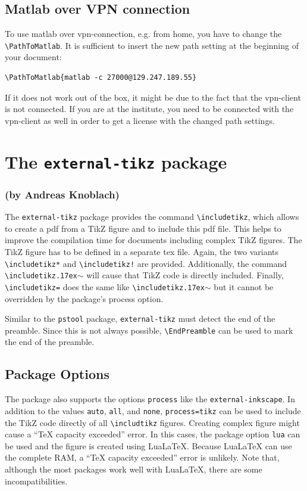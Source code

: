 \documentclass{article}
\let\otextbackslash\textbackslash
\renewcommand\textbackslash{{\rmfamily\otextbackslash}}
\def\tttilde{\raise.17ex\hbox{$\scriptstyle\mathtt{\sim}$}}
\begin{document}
\subsection{Matlab over VPN connection}
To use matlab over vpn-connection, e.g. from home, you have to change the \texttt{\textbackslash PathToMatlab}. It is sufficient to insert the new path setting at the beginning of your document:
\begin{verbatim}
\PathToMatlab{matlab -c 27000@129.247.189.55}
\end{verbatim}
If it does not work out of the box, it might be due to the fact that the vpn-client is not connected. If you are at the institute, you need to be connected with the vpn-client as well in order to get a license with the changed path settings.

\section{The \texttt{external-tikz} package}
\subsubsection*{(by Andreas Knoblach)}
The \texttt{external-tikz} package provides the command \texttt{\textbackslash includetikz}, which allows to create a pdf from a TikZ figure and to include this pdf file.  This helps to improve the compilation time for documents including complex TikZ figures. The TikZ figure has to be defined in a separate tex file. Again, the two variants \texttt{\textbackslash includetikz*} and \texttt{\textbackslash includetikz!} are provided. Additionally, the command \texttt{\textbackslash includetikz\tttilde} will cause that TikZ code is directly included. Finally, \texttt{\textbackslash includetikz=} does the same like \texttt{\textbackslash includetikz\tttilde} but it cannot be overridden by the package's process option.

Similar to the \texttt{pstool} package, \texttt{external-tikz} must detect the end of the preamble. Since this is not always possible, \texttt{\textbackslash EndPreamble} can be used to mark the end of the preamble.

\subsection{Package Options}
The package also supports the options \texttt{process} like the \texttt{external-inkscape}. In addition to the values  \texttt{auto}, \texttt{all}, and \texttt{none}, \texttt{process=tikz} can be used to include the TikZ code directly of all \texttt{\textbackslash includtikz} figures. Creating complex figure might cause a \enquote{TeX capacity exceeded} error. In this cases, the package option \texttt{lua} can be used and the figure is created using LuaLaTeX. Because LuaLaTeX can use the complete RAM, a \enquote{TeX capacity exceeded} error is unlikely. Note that, although the most packages work well with LuaLaTeX, there are some incompatibilities.
\end{document}
